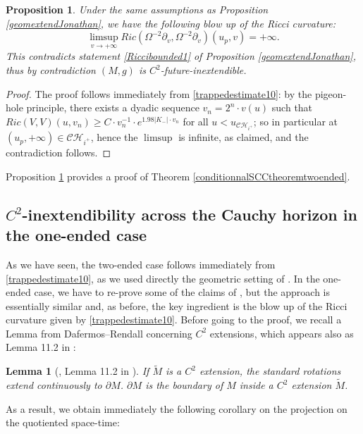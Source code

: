 \documentclass[10pt,a4paper]{article}
\theoremstyle{plain}
\newtheorem{lem}[thm]{Lemma}
\newtheorem{prop}[thm]{Proposition}
\theoremstyle{remark}
\theoremstyle{definition}
\theoremstyle{plain}
\theoremstyle{remark}
\theoremstyle{definition}
\newcommand{\CH}{\mathcal{CH}_{i^+}}
\numberwithin{equation}{section}
\begin{document}
\begin{prop} \label{Ricciblowupprop} Under the same assumptions as Proposition \ref{geomextendJonathan}, we have the following blow up of the Ricci curvature: $$ \limsup_{v \rightarrow +\infty} Ric(\Omega^{-2} \partial_v, \Omega^{-2} \partial_v)(u_p,v)=+\infty.$$
	This contradicts statement \ref{Riccibounded1} of Proposition \ref{geomextendJonathan}, thus by contradiction $(M,g)$ is $C^2$-future-inextendible.
\end{prop}
\begin{proof} The proof follows immediately from \eqref{trappedestimate10}: by the pigeon-hole principle, there exists a dyadic sequence $v_n = 2^n \cdot v(u)$ such that $Ric(V,V)(u,v_n) \geq C \cdot v_n^{-1} \cdot  e^{1.98 |K_-| \cdot v_n}$ for all $u < u_{\CH}$; so in particular at $(u_p,+\infty) \in \CH$, hence the $\limsup$ is infinite, as claimed, and the contradiction follows.
	
	
	
	
	
	
	
	
\end{proof}

Proposition \ref{Ricciblowupprop} provides a proof of Theorem \ref{conditionnalSCCtheoremtwoended}.
\subsection{$C^2$-inextendibility across the Cauchy horizon in the one-ended case} \label{oneendedext1}

As we have seen, the two-ended case follows immediately from \eqref{trappedestimate10}, as we used directly the geometric setting of \cite{JonathanStab}. In the one-ended case, we have to re-prove some of the claims of \cite{JonathanStab}, but the approach is essentially similar and, as before, the key ingredient is the blow up of the Ricci curvature given by \eqref{trappedestimate10}. Before going to the proof, we recall a Lemma from Dafermos--Rendall \cite{DafermosRendall} concerning $C^2$ extensions, which appears also as Lemma 11.2 in \cite{JonathanStab}: \begin{lem}[\cite{DafermosRendall}, Lemma 11.2 in \cite{JonathanStab}] \label{DafermosRendallLemma}If $\tilde{M}$ is a $C^2$ extension, the standard rotations extend continuously to $\partial M$. $\partial M$ is the boundary of $M$ inside a $C^2$ extension $\tilde{M}$.\end{lem}As a result, we obtain immediately the following corollary on the projection on the quotiented space-time: %
\end{document}
